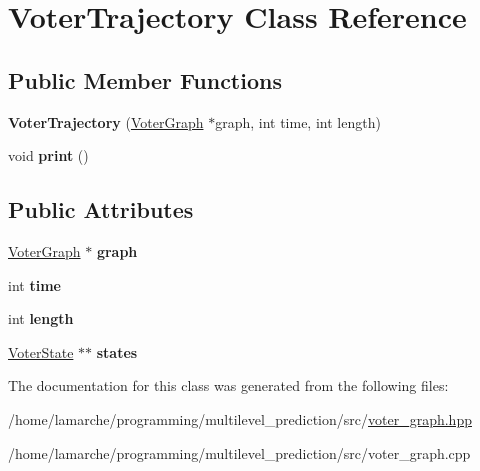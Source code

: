 \hypertarget{class_voter_trajectory}{\section{Voter\-Trajectory Class Reference}
\label{class_voter_trajectory}
}
\subsection*{Public Member Functions}
\begin{DoxyCompactItemize}
\item 
\hypertarget{class_voter_trajectory_aeed05c584f004a49264220c6d28a9bf6}{{\bfseries Voter\-Trajectory} (\hyperlink{class_voter_graph}{Voter\-Graph} $\ast$graph, int time, int length)}\label{class_voter_trajectory_aeed05c584f004a49264220c6d28a9bf6}

\item 
\hypertarget{class_voter_trajectory_a26679dac87b6f3659e6535cfab866254}{void {\bfseries print} ()}\label{class_voter_trajectory_a26679dac87b6f3659e6535cfab866254}

\end{DoxyCompactItemize}
\subsection*{Public Attributes}
\begin{DoxyCompactItemize}
\item 
\hypertarget{class_voter_trajectory_a650891344ead65411afe1568049f806b}{\hyperlink{class_voter_graph}{Voter\-Graph} $\ast$ {\bfseries graph}}\label{class_voter_trajectory_a650891344ead65411afe1568049f806b}

\item 
\hypertarget{class_voter_trajectory_a11c81f8457dd6bcffd4f757827f281d7}{int {\bfseries time}}\label{class_voter_trajectory_a11c81f8457dd6bcffd4f757827f281d7}

\item 
\hypertarget{class_voter_trajectory_aafa577619f3ae1d3de54cc8dd6d1636e}{int {\bfseries length}}\label{class_voter_trajectory_aafa577619f3ae1d3de54cc8dd6d1636e}

\item 
\hypertarget{class_voter_trajectory_a352892f77ab95ac223c7621e12e73b5e}{\hyperlink{class_voter_state}{Voter\-State} $\ast$$\ast$ {\bfseries states}}\label{class_voter_trajectory_a352892f77ab95ac223c7621e12e73b5e}

\end{DoxyCompactItemize}


The documentation for this class was generated from the following files\-:\begin{DoxyCompactItemize}
\item 
/home/lamarche/programming/multilevel\-\_\-prediction/src/\hyperlink{voter__graph_8hpp}{voter\-\_\-graph.\-hpp}\item 
/home/lamarche/programming/multilevel\-\_\-prediction/src/voter\-\_\-graph.\-cpp\end{DoxyCompactItemize}
